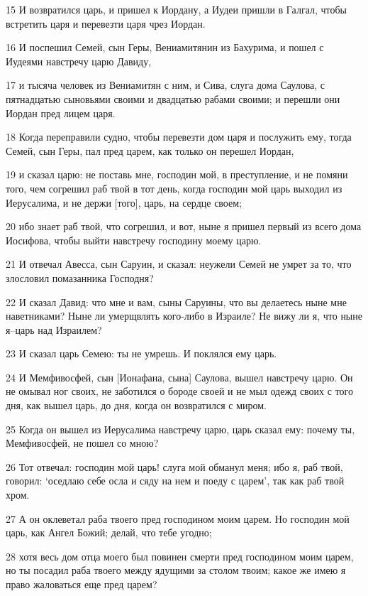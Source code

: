 \par 15 И возвратился царь, и пришел к Иордану, а Иудеи пришли в Галгал, чтобы встретить царя и перевезти царя чрез Иордан.
\par 16 И поспешил Семей, сын Геры, Вениамитянин из Бахурима, и пошел с Иудеями навстречу царю Давиду,
\par 17 и тысяча человек из Вениамитян с ним, и Сива, слуга дома Саулова, с пятнадцатью сыновьями своими и двадцатью рабами своими; и перешли они Иордан пред лицем царя.
\par 18 Когда переправили судно, чтобы перевезти дом царя и послужить ему, тогда Семей, сын Геры, пал пред царем, как только он перешел Иордан,
\par 19 и сказал царю: не поставь мне, господин мой, в преступление, и не помяни того, чем согрешил раб твой в тот день, когда господин мой царь выходил из Иерусалима, и не держи [того], царь, на сердце своем;
\par 20 ибо знает раб твой, что согрешил, и вот, ныне я пришел первый из всего дома Иосифова, чтобы выйти навстречу господину моему царю.
\par 21 И отвечал Авесса, сын Саруин, и сказал: неужели Семей не умрет за то, что злословил помазанника Господня?
\par 22 И сказал Давид: что мне и вам, сыны Саруины, что вы делаетесь ныне мне наветниками? Ныне ли умерщвлять кого-либо в Израиле? Не вижу ли я, что ныне я--царь над Израилем?
\par 23 И сказал царь Семею: ты не умрешь. И поклялся ему царь.
\par 24 И Мемфивосфей, сын [Ионафана, сына] Саулова, вышел навстречу царю. Он не омывал ног своих, не заботился о бороде своей и не мыл одежд своих с того дня, как вышел царь, до дня, когда он возвратился с миром.
\par 25 Когда он вышел из Иерусалима навстречу царю, царь сказал ему: почему ты, Мемфивосфей, не пошел со мною?
\par 26 Тот отвечал: господин мой царь! слуга мой обманул меня; ибо я, раб твой, говорил: `оседлаю себе осла и сяду на нем и поеду с царем', так как раб твой хром.
\par 27 А он оклеветал раба твоего пред господином моим царем. Но господин мой царь, как Ангел Божий; делай, что тебе угодно;
\par 28 хотя весь дом отца моего был повинен смерти пред господином моим царем, но ты посадил раба твоего между ядущими за столом твоим; какое же имею я право жаловаться еще пред царем?
